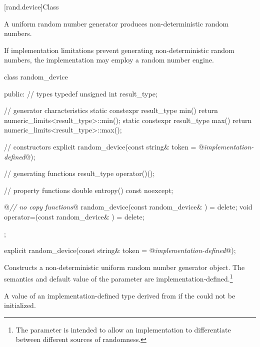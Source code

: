 

[rand.device]{Class }%

\pnum
A 
uniform random number generator
produces non-deterministic random numbers.

\pnum
If implementation limitations%
prevent generating non-deterministic random numbers,
the implementation may employ a random number engine.

\begin{codeblock}
class random_device
{
public:
 // types
 typedef unsigned int result_type;

 // generator characteristics
 static constexpr result_type min() { return numeric_limits<result_type>::min(); }
 static constexpr result_type max() { return numeric_limits<result_type>::max(); }

 // constructors
 explicit random_device(const string& token = @\textit{implementation-defined}@);

 // generating functions
 result_type operator()();

 // property functions
 double entropy() const noexcept;

 @\textit{// no copy functions}@
 random_device(const random_device& ) = delete;
 void operator=(const random_device& ) = delete;
};
\end{codeblock}


%
\begin{itemdecl}
explicit random_device(const string& token = @\textit{implementation-defined}@);
\end{itemdecl}

\begin{itemdescr}
\pnum\effects Constructs a 
 non-deterministic uniform random number generator object.
 The semantics and default value of the 
 parameter are implementation-defined.\footnote{   The parameter is intended
   to allow an implementation to differentiate
   between different sources of randomness.
 }

\pnum
\throws A value of an implementation-defined type
 derived from 
 if the  could not be initialized.
\end{itemdescr}

